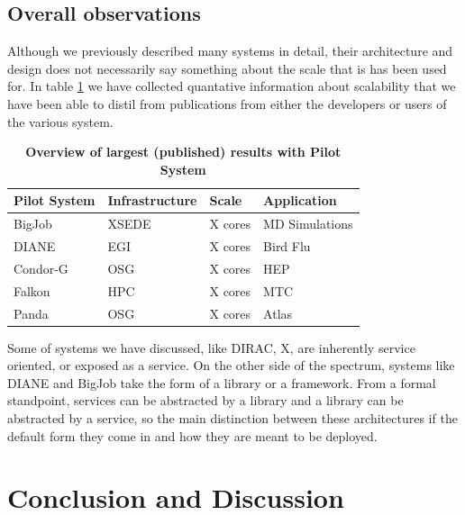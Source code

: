 \documentclass{sig-alternate}
\begin{document}
\subsection{Overall observations}

Although we previously described many \pilot systems in detail, their
architecture and design does not necessarily say something about the scale that
is has been used for. In table \ref{table:scale} we have collected quantative
information about scalability that we have been able to distil from
publications from either the developers or users of the various system.

\begin{table}
 \centering
 \begin{tabular}{|p{3cm}|p{3.0cm}|p{2.0cm}|p{3.0cm}|}
  \hline
    \textbf{Pilot System} & \textbf{Infrastructure} & \textbf{Scale}  &
    \textbf{Application}\\
  \hline
  \hline
    BigJob & XSEDE & X cores & MD Simulations \cite{} \\
  \hline
    DIANE & EGI & X cores & Bird Flu \cite{} \\
  \hline
    Condor-G & OSG & X cores & HEP \cite{} \\
  \hline
    Falkon & HPC & X cores & MTC \cite{} \\
  \hline
    Panda & OSG & X cores & Atlas \cite{} \\
  \hline
 \end{tabular}
 \caption{\textbf{Overview of largest (published) results with Pilot System}}
 \label{table:scale}
\end{table}

Some of systems we have discussed, like DIRAC, X, are inherently service
oriented, or exposed as a service.
On the other side of the spectrum, systems like DIANE and BigJob take the form
of a library or a framework.
From a formal standpoint, services can be abstracted by a library and a library
can be abstracted by a service, so the main distinction between these
architectures if the default form they come in and how they are meant to be
deployed.

\section{Conclusion and Discussion}
\label{sec:5}
\end{document}

